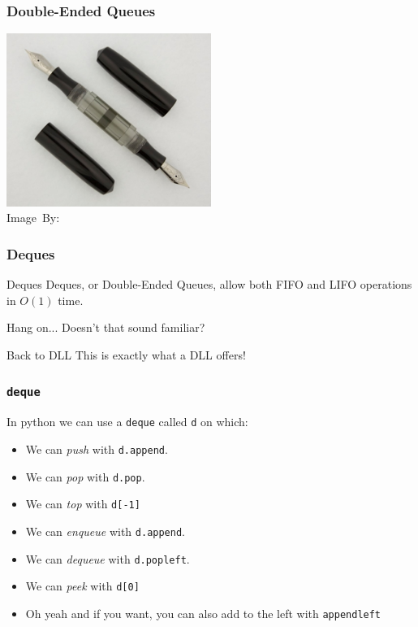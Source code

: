 \begin{frame}
	\frametitle{Double-Ended Queues}

	\begin{center}
		\includegraphics[width=0.5\textwidth]{figures/de.jpg}\\
		\hspace*{15pt}\hbox{\scriptsize Image By:}
	\end{center}
\end{frame}

\begin{frame}
	\frametitle{Deques}
		\begin{block}{Deques}
			Deques, or Double-Ended Queues, allow both FIFO and LIFO operations in $O(1)$ time.
		\end{block}		
		\pause
		\begin{questionblock}{Hang on...}
			Doesn't that sound familiar?	
		\end{questionblock}
		\pause
		\begin{answerblock}{Back to DLL}
			This is exactly what a DLL offers!
		\end{answerblock}
\end{frame}

\begin{frame}
	\frametitle{\texttt{deque}}
	
	In python we can use a \texttt{deque} called \texttt{d} on which:
	\begin{itemize}
		\item We can \textit{push} with \texttt{d.append}.
		\item We can \textit{pop} with \texttt{d.pop}.
		\item We can \textit{top} with \texttt{d[-1]}
			\pause
		\item We can \textit{enqueue} with \texttt{d.append}.
		\item We can \textit{dequeue} with \texttt{d.popleft}.
		\item We can \textit{peek} with \texttt{d[0]}
			\pause
		\item Oh yeah and if you want, you can also add to the left with \texttt{appendleft}
	\end{itemize}
\end{frame}


